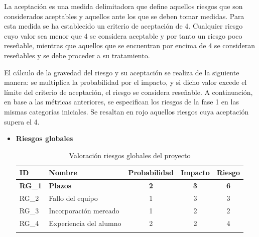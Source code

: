 \begin{enumerate}
\begin{itemize}
\endgroup
\end{itemize}
\par La aceptación es una medida delimitadora que define aquellos riesgos que son considerados aceptables y aquellos ante los que se deben tomar medidas. Para esta medida se ha establecido un criterio de aceptación de 4. Cualquier riesgo cuyo valor sea menor que 4 se considera aceptable y por tanto un riesgo poco reseñable, mientras que aquellos que se encuentran por encima de 4 se consideran reseñables y se debe proceder a su tratamiento. 
\par
El cálculo de la gravedad del riesgo y su aceptación se realiza de la siguiente manera: se multiplica la probabilidad por el impacto, y si dicho valor excede el límite del criterio de aceptación, el riesgo se considera reseñable. 
A continuación, en base a las métricas anteriores, se especifican los riesgos de la fase 1 en las mismas categorías iniciales. Se resaltan en rojo aquellos riesgos cuya aceptación supera el 4.

\begin{itemize}

\item \textbf{Riesgos globales}
\begingroup
\renewcommand\arraystretch{1.3}

\begin{longtable}{l p{5cm} ccc}
\hline
\textbf{ID} & \textbf{Nombre} & \textbf{Probabilidad} & \textbf{Impacto} & \textbf{Riesgo} \\
\hline
\endhead
\endfoot
\textbf{RG\_1} & 
\textbf{Plazos} &
\textbf{2} &
\textbf{3} &
\textbf{6} 
 \\
RG\_2 & 
Fallo del equipo &
1 &
3 &
3 
 \\
RG\_3 & 
Incorporación mercado &
1 &
2 &
2 
 \\
RG\_4 & 
Experiencia del alumno &
2 &
2 &
4 
 \\
\hline
\caption{Valoración riesgos globales del proyecto}\label{ries_glob_valoracion}\\
\end{longtable}


\end{itemize}
\end{enumerate}
